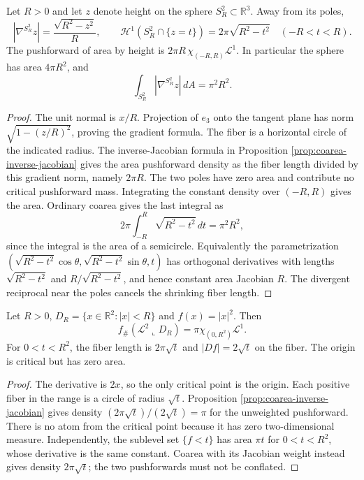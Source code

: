 \begin{example}\label{ex:coarea-sphere-height}
Let $R>0$ and let $z$ denote height on the sphere $S_R^2\subset\mathbb R^3$. Away from its poles,
\[
 |\nabla^{S_R^2}z|=\frac{\sqrt{R^2-z^2}}R,
 \qquad \mathcal H^1(S_R^2\cap\{z=t\})=2\pi\sqrt{R^2-t^2}
 \quad(-R<t<R).
\]
The pushforward of area by height is $2\pi R\,\chi_{(-R,R)}\mathcal L^1$. In particular the sphere has area $4\pi R^2$, and
\[
 \int_{S_R^2}|\nabla^{S_R^2}z|\,dA=\pi^2R^2.
\]
\end{example}
\begin{proof}
The unit normal is $x/R$. Projection of $e_3$ onto the tangent plane has norm $\sqrt{1-(z/R)^2}$, proving the gradient formula. The fiber is a horizontal circle of the indicated radius. The inverse-Jacobian formula in Proposition \ref{prop:coarea-inverse-jacobian} gives the area pushforward density as the fiber length divided by this gradient norm, namely $2\pi R$. The two poles have zero area and contribute no critical pushforward mass. Integrating the constant density over $(-R,R)$ gives the area. Ordinary coarea gives the last integral as
\[
 2\pi\int_{-R}^R\sqrt{R^2-t^2}\,dt=\pi^2R^2,
\]
since the integral is the area of a semicircle. Equivalently the parametrization $(\sqrt{R^2-t^2}\cos\theta,\sqrt{R^2-t^2}\sin\theta,t)$ has orthogonal derivatives with lengths $\sqrt{R^2-t^2}$ and $R/\sqrt{R^2-t^2}$, and hence constant area Jacobian $R$. The divergent reciprocal near the poles cancels the shrinking fiber length.
\end{proof}

\begin{example}\label{ex:coarea-squared-radius-disk}
Let $R>0$, $D_R=\{x\in\mathbb R^2:|x|<R\}$ and $f(x)=|x|^2$. Then
\[
 f_\#(\mathcal L^2\llcorner D_R)=\pi\chi_{(0,R^2)}\mathcal L^1.
\]
For $0<t<R^2$, the fiber length is $2\pi\sqrt t$ and $|Df|=2\sqrt t$ on the fiber. The origin is critical but has zero area.
\end{example}
\begin{proof}
The derivative is $2x$, so the only critical point is the origin. Each positive fiber in the range is a circle of radius $\sqrt t$. Proposition \ref{prop:coarea-inverse-jacobian} gives density $(2\pi\sqrt t)/(2\sqrt t)=\pi$ for the unweighted pushforward. There is no atom from the critical point because it has zero two-dimensional measure. Independently, the sublevel set $\{f<t\}$ has area $\pi t$ for $0<t<R^2$, whose derivative is the same constant. Coarea with its Jacobian weight instead gives density $2\pi\sqrt t$; the two pushforwards must not be conflated.
\end{proof}

